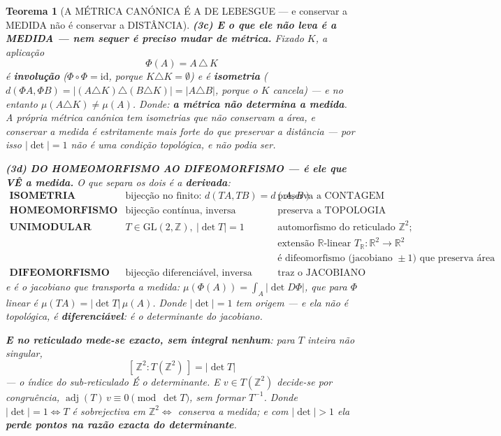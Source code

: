 \documentclass[11pt,a4paper]{article}
\newtheorem{teorema}{Teorema}
\newcommand{\abs}[1]{\lvert #1\rvert}
\begin{document}
\begin{teorema}[A MÉTRICA CANÓNICA É A DE LEBESGUE --- e conservar a MEDIDA não é
conservar a DISTÂNCIA]
\textbf{(3c) E o que ele não leva é a MEDIDA --- nem sequer é preciso mudar de métrica.}
Fixado $K$, a aplicação
\[
\boxed{\;\Phi(A)=A\,\triangle\,K\;}
\]
é \textbf{involução} ($\Phi\circ\Phi=\mathrm{id}$, porque $K\triangle K=\emptyset$) e é
\textbf{isometria} ($d(\Phi A,\Phi B)=\abs{(A\triangle K)\triangle(B\triangle K)}
=\abs{A\triangle B}$, porque o $K$ cancela) --- \emph{e no entanto}
$\mu(A\triangle K)\neq\mu(A)$. Donde: \textbf{a métrica não determina a medida}. A própria
métrica canónica tem isometrias que não conservam a área, e \emph{conservar a medida é
estritamente mais forte do que preservar a distância} --- por isso $\abs{\det}=1$ não é uma
condição topológica, e não podia ser.

\textbf{(3d) DO HOMEOMORFISMO AO DIFEOMORFISMO --- é ele que VÊ a medida.} O
que separa os dois é a \textbf{derivada}:
\[
\begin{array}{lll}
\textbf{ISOMETRIA DISCRETA} & \text{bijecção no finito: }d(TA,TB)=d(A,B) &
\text{preserva a CONTAGEM}\\[2pt]
\textbf{HOMEOMORFISMO} & \text{bijecção contínua, inversa contínua} &
\text{preserva a TOPOLOGIA (trivial no finito)}\\[2pt]
\textbf{UNIMODULAR} & T\in\mathrm{GL}(2,\mathbb{Z}),\ \abs{\det T}=1 &
\text{automorfismo do reticulado }\mathbb{Z}^{2};\\[1pt]
& & \text{extensão }\mathbb{R}\text{-linear }T_{\mathbb{R}}\colon\mathbb{R}^{2}\to\mathbb{R}^{2}\\
& & \text{é difeomorfismo (jacobiano }\pm1\text{) que preserva área}\\[2pt]
\textbf{DIFEOMORFISMO} & \text{bijecção diferenciável, inversa idem} &
\text{traz o JACOBIANO}
\end{array}
\]
e é o jacobiano que transporta a medida: $\mu(\Phi(A))=\int_A\abs{\det D\Phi}$, que para
$\Phi$ linear é $\mu(TA)=\abs{\det T}\,\mu(A)$. \emph{Donde $\abs{\det}=1$ tem origem} ---
e ela não é topológica, é \textbf{diferenciável}: é o determinante do jacobiano.

\textbf{E no reticulado mede-se exacto, sem integral nenhum}: para $T$ inteira não
singular,
\[
\boxed{\;[\,\mathbb{Z}^{2}:T(\mathbb{Z}^{2})\,]=\abs{\det T}\;}
\]
--- o \emph{índice} do sub-reticulado É o determinante. E $v\in T(\mathbb{Z}^{2})$
decide-se por congruência, $\operatorname{adj}(T)\,v\equiv0\pmod{\det T}$, sem formar
$T^{-1}$. Donde $\abs{\det}=1\iff T$ é sobrejectiva em $\mathbb{Z}^{2}\iff$ conserva a
medida; e com $\abs{\det}>1$ ela \textbf{perde pontos na razão exacta do determinante}.


\end{teorema}
\end{document}

